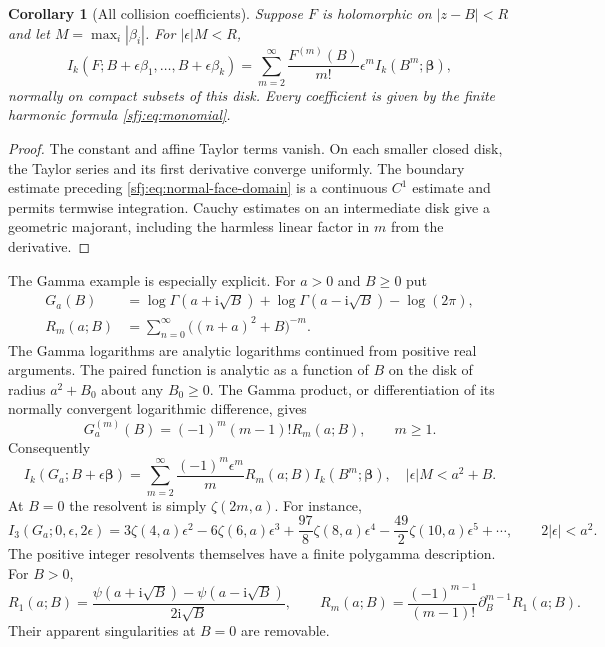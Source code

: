 \documentclass[11pt,letterpaper]{article}
\numberwithin{equation}{section}
\newtheorem{corollary}[theorem]{Corollary}
\theoremstyle{definition}
\theoremstyle{remark}
\newcommand{\ii}{\mathrm i}
\begin{document}
\begin{corollary}[All collision coefficients]
\label{sfj:cor:collision}
Suppose $F$ is holomorphic on $|z-B|<R$ and let
$M=\max_i|\beta_i|$.  For $|\epsilon|M<R$,
\begin{equation}\label{sfj:eq:collision}
 I_k(F;B+\epsilon\beta_1,\ldots,B+\epsilon\beta_k)
  =\sum_{m=2}^\infty
       \frac{F^{(m)}(B)}{m!}\epsilon^m
                     I_k(B^m;\boldsymbol\beta),
\end{equation}
normally on compact subsets of this disk.  Every coefficient is given
by the finite harmonic formula \eqref{sfj:eq:monomial}.
\end{corollary}
\begin{proof}
The constant and affine Taylor terms vanish.  On each smaller closed
disk, the Taylor series and its first derivative converge uniformly.
The boundary estimate preceding \eqref{sfj:eq:normal-face-domain}
is a continuous $C^1$ estimate and permits termwise integration.
Cauchy estimates on an intermediate disk give a geometric majorant,
including the harmless linear factor in $m$ from the derivative.
\end{proof}

The Gamma example is especially explicit.  For $a>0$ and $B\ge0$ put
\begin{align}
 G_a(B)&=\log\Gamma(a+\ii\sqrt B)
          +\log\Gamma(a-\ii\sqrt B)-\log(2\pi),
                    \label{sfj:eq:gammaG}\\
 R_m(a;B)&=\sum_{n=0}^\infty\bigl((n+a)^2+B\bigr)^{-m}.
                    \label{sfj:eq:resolvent}
\end{align}
The Gamma logarithms are analytic logarithms continued from positive
real arguments.  The paired function is analytic as a function of
$B$ on the disk of radius $a^2+B_0$ about any $B_0\ge0$.  The
Gamma product, or differentiation of its normally convergent logarithmic
difference, gives
\begin{equation}\label{sfj:eq:gamma-derivatives}
 G_a^{(m)}(B)=(-1)^m(m-1)!R_m(a;B),\qquad m\ge1.
\end{equation}
Consequently
\begin{equation}\label{sfj:eq:gamma-collision}
 \boxed{\displaystyle
 I_k(G_a;B+\epsilon\boldsymbol\beta)
   =\sum_{m=2}^\infty\frac{(-1)^m\epsilon^m}{m}
                  R_m(a;B)I_k(B^m;\boldsymbol\beta),
 \quad |\epsilon|M<a^2+B.}
\end{equation}
At $B=0$ the resolvent is simply $\zeta(2m,a)$.  For instance,
\begin{equation}\label{sfj:eq:gamma-three-example}
 I_3(G_a;0,\epsilon,2\epsilon)
   =3\zeta(4,a)\epsilon^2-6\zeta(6,a)\epsilon^3
       +\frac{97}{8}\zeta(8,a)\epsilon^4
       -\frac{49}{2}\zeta(10,a)\epsilon^5+\cdots,
 \qquad 2|\epsilon|<a^2.
\end{equation}
The positive integer resolvents themselves have a finite polygamma
description.  For $B>0$,
\begin{equation}\label{sfj:eq:resolvent-digamma}
 R_1(a;B)=
 \frac{\psi(a+\ii\sqrt B)-\psi(a-\ii\sqrt B)}{2\ii\sqrt B},
 \qquad
 R_m(a;B)=\frac{(-1)^{m-1}}{(m-1)!}
                 \partial_B^{m-1}R_1(a;B).
\end{equation}
Their apparent singularities at $B=0$ are removable.
\end{document}
